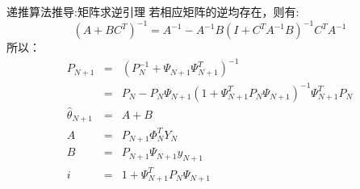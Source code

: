 \begin{frame}{递推算法推导:矩阵求逆引理}
若相应矩阵的逆均存在，则有:
$$
(A+BC^T)^{-1}=A^{-1}-A^{-1}B(I+C^T A^{-1} B)^{-1} C^T A^{-1}
$$
所以：
\begin{eqnarray*}
P_{N+1} &=&(P_N^{-1}+\Psi_{N+1}\Psi_{N+1}^T)^{-1} \\
&=& P_N -P_N\Psi_{N+1}(1+\Psi_{N+1}^T P_N \Psi_{N+1})^{-1}\Psi_{N+1}^T P_N \\
\hat\theta_{N+1} &=& A+B \\
A&=&P_{N+1}\Phi_N^T Y_N \\
B&=&P_{N+1}\Psi_{N+1} y_{N+1} \\
i&=& 1+\Psi_{N+1}^T P_N \Psi_{N+1}
\end{eqnarray*}
\end{frame}

\bgroup
{}

